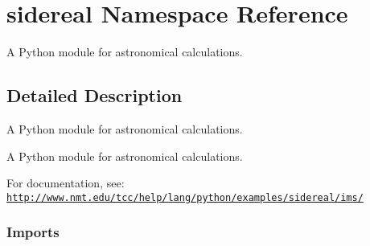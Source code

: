 \hypertarget{namespacesidereal}{\section{sidereal Namespace Reference}
\label{namespacesidereal}
}


A Python module for astronomical calculations.  




\subsection{Detailed Description}
A Python module for astronomical calculations. \begin{DoxyVerb}A Python module for astronomical calculations.\end{DoxyVerb}


For documentation, see\-: \href{http://www.nmt.edu/tcc/help/lang/python/examples/sidereal/ims/}{\tt http\-://www.\-nmt.\-edu/tcc/help/lang/python/examples/sidereal/ims/} 

 \subsubsection*{Imports }